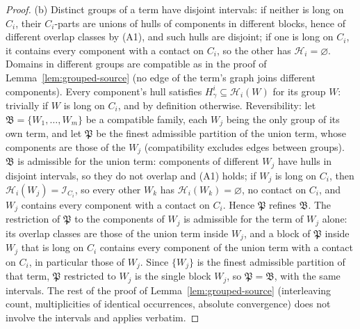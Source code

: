\begin{proof}
(b) Distinct groups of a term have disjoint intervals: if neither is long on $C_i$, their $C_i$-parts are unions of hulls of components in different blocks, hence of different overlap classes by (A1), and such hulls are disjoint; if one is long on $C_i$, it contains every component with a contact on $C_i$, so the other has $\mathcal H_i=\varnothing$. Domains in different groups are compatible as in the proof of Lemma~\ref{lem:grouped-source} (no edge of the term's graph joins different components). Every component's hull satisfies $H^i_\gamma\subseteq\mathcal H_i(W)$ for its group $W$: trivially if $W$ is long on $C_i$, and by definition otherwise. Reversibility: let $\mathfrak B=\{W_1,\ldots,W_m\}$ be a compatible family, each $W_j$ being the only group of its own term, and let $\mathfrak P$ be the finest admissible partition of the union term, whose components are those of the $W_j$ (compatibility excludes edges between groups). $\mathfrak B$ is admissible for the union term: components of different $W_j$ have hulls in disjoint intervals, so they do not overlap and (A1) holds; if $W_j$ is long on $C_i$, then $\mathcal H_i(W_j)=\mathcal I_{C_i}$, so every other $W_k$ has $\mathcal H_i(W_k)=\varnothing$, no contact on $C_i$, and $W_j$ contains every component with a contact on $C_i$. Hence $\mathfrak P$ refines $\mathfrak B$. The restriction of $\mathfrak P$ to the components of $W_j$ is admissible for the term of $W_j$ alone: its overlap classes are those of the union term inside $W_j$, and a block of $\mathfrak P$ inside $W_j$ that is long on $C_i$ contains every component of the union term with a contact on $C_i$, in particular those of $W_j$. Since $\{W_j\}$ is the finest admissible partition of that term, $\mathfrak P$ restricted to $W_j$ is the single block $W_j$, so $\mathfrak P=\mathfrak B$, with the same intervals. The rest of the proof of Lemma~\ref{lem:grouped-source} (interleaving count, multiplicities of identical occurrences, absolute convergence) does not involve the intervals and applies verbatim.


\end{proof}
